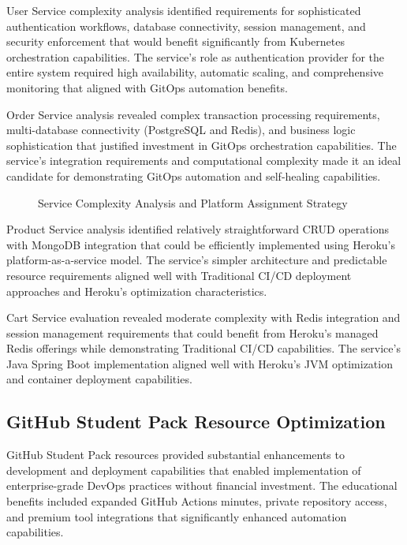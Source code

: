 User Service complexity analysis identified requirements for sophisticated authentication workflows, database connectivity, session management, and security enforcement that would benefit significantly from Kubernetes orchestration capabilities. The service's role as authentication provider for the entire system required high availability, automatic scaling, and comprehensive monitoring that aligned with GitOps automation benefits.

Order Service analysis revealed complex transaction processing requirements, multi-database connectivity (PostgreSQL and Redis), and business logic sophistication that justified investment in GitOps orchestration capabilities. The service's integration requirements and computational complexity made it an ideal candidate for demonstrating GitOps automation and self-healing capabilities.

\begin{figure}[H]
\centering
\caption{Service Complexity Analysis and Platform Assignment Strategy}
\label{fig:service-complexity-matrix}
\end{figure}

Product Service analysis identified relatively straightforward CRUD operations with MongoDB integration that could be efficiently implemented using Heroku's platform-as-a-service model. The service's simpler architecture and predictable resource requirements aligned well with Traditional CI/CD deployment approaches and Heroku's optimization characteristics.

Cart Service evaluation revealed moderate complexity with Redis integration and session management requirements that could benefit from Heroku's managed Redis offerings while demonstrating Traditional CI/CD capabilities. The service's Java Spring Boot implementation aligned well with Heroku's JVM optimization and container deployment capabilities.

\subsection{GitHub Student Pack Resource Optimization}

GitHub Student Pack resources provided substantial enhancements to development and deployment capabilities that enabled implementation of enterprise-grade DevOps practices without financial investment. The educational benefits included expanded GitHub Actions minutes, private repository access, and premium tool integrations that significantly enhanced automation capabilities.

